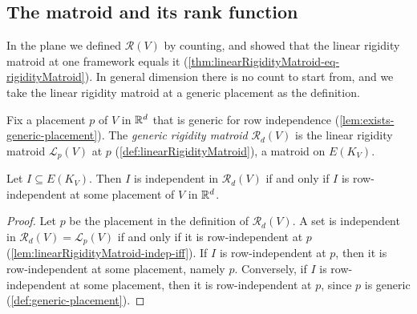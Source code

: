 \subsection{The matroid and its rank function}
\label{sec:bar-joint-3d-matroid}

In the plane we defined $\mathcal{R}(V)$ by counting, and showed that
the linear rigidity matroid at one framework equals it
(\cref{thm:linearRigidityMatroid-eq-rigidityMatroid}). In general
dimension there is no count to start from, and we take the linear
rigidity matroid at a generic placement as the definition.

\begin{definition}
  \label{def:genericRigidityMatroid}
  \leanok
  Fix a placement $p$ of $V$ in ${\mathbb{R}}^{d}$ that is generic for row
  independence (\cref{lem:exists-generic-placement}). The
  \emph{generic rigidity matroid} $\mathcal{R}_d(V)$ is the linear
  rigidity matroid $\mathcal{L}_p(V)$ at $p$
  (\cref{def:linearRigidityMatroid}), a matroid on $E(K_V)$.
\end{definition}

\begin{lemma}
  \label{lem:genericRigidityMatroid-indep-iff}
  \leanok
  Let $I \subseteq E(K_V)$. Then $I$ is independent in
  $\mathcal{R}_d(V)$ if and only if $I$ is row-independent at some
  placement of $V$ in ${\mathbb{R}}^{d}$.
\end{lemma}
\begin{proof}
  \leanok
  Let $p$ be the placement in the definition of $\mathcal{R}_d(V)$. A
  set is independent in $\mathcal{R}_d(V) = \mathcal{L}_p(V)$ if and
  only if it is row-independent at $p$
  (\cref{lem:linearRigidityMatroid-indep-iff}). If $I$ is
  row-independent at $p$, then it is row-independent at some placement,
  namely $p$. Conversely, if $I$ is row-independent at some
  placement, then it is row-independent at $p$, since $p$ is generic
  (\cref{def:generic-placement}).
\end{proof}

